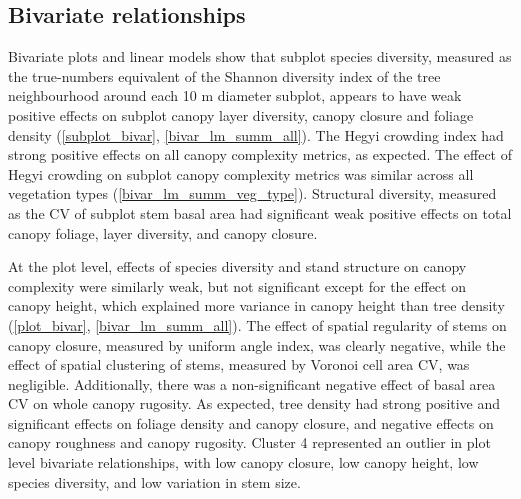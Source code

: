 \documentclass[11pt,a4paper]{article}
\begin{document}
\subsection{Bivariate relationships}

Bivariate plots and linear models show that subplot species diversity, measured as the true-numbers equivalent of the Shannon diversity index of the tree neighbourhood around each 10 m diameter subplot, appears to have weak positive effects on subplot canopy layer diversity, canopy closure and foliage density (\autoref{subplot_bivar}, \autoref{bivar_lm_summ_all}). The Hegyi crowding index had strong positive effects on all canopy complexity metrics, as expected. The effect of Hegyi crowding on subplot canopy complexity metrics was similar across all vegetation types (\autoref{bivar_lm_summ_veg_type}). Structural diversity, measured as the CV of subplot stem basal area had significant weak positive effects on total canopy foliage, layer diversity, and canopy closure. 

At the plot level, effects of species diversity and stand structure on canopy complexity were similarly weak, but not significant except for the effect on canopy height, which explained more variance in canopy height than tree density (\autoref{plot_bivar}, \autoref{bivar_lm_summ_all}). The effect of spatial regularity of stems on canopy closure, measured by uniform angle index, was clearly negative, while the effect of spatial clustering of stems, measured by Voronoi cell area CV, was negligible. Additionally, there was a non-significant negative effect of basal area CV on whole canopy rugosity. As expected, tree density had strong positive and significant effects on foliage density and canopy closure, and negative effects on canopy roughness and canopy rugosity. Cluster 4 represented an outlier in plot level bivariate relationships, with low canopy closure, low canopy height, low species diversity, and low variation in stem size.


\end{document}
